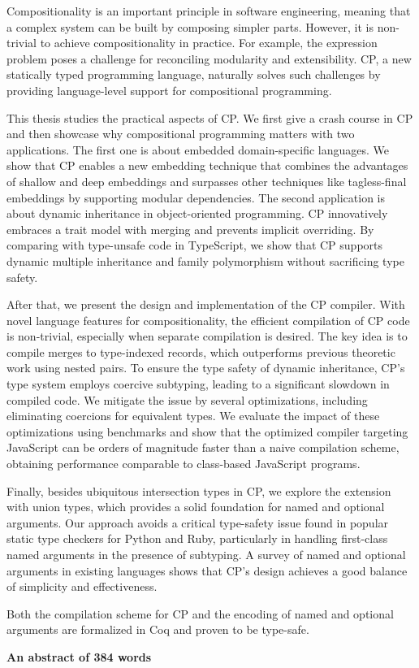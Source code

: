 \noindent
Compositionality is an important principle in software engineering, meaning that
a complex system can be built by composing simpler parts. However, it is
non-trivial to achieve compositionality in practice. For example, the expression
problem poses a challenge for reconciling modularity and extensibility. CP, a
new statically typed programming language, naturally solves such challenges by
providing language-level support for compositional programming.

This thesis studies the practical aspects of CP.
We first give a crash course in CP and then showcase why
compositional programming matters with two applications. The first one is about
embedded domain-specific languages. We show that CP enables a new embedding
technique that combines the advantages of shallow and deep embeddings and
surpasses other techniques like tagless-final embeddings by supporting modular
dependencies. The second application is about dynamic inheritance in
object-oriented programming. CP innovatively embraces a trait model with merging
and prevents implicit overriding. By comparing with type-unsafe code in
TypeScript, we show that CP supports dynamic multiple inheritance and family
polymorphism without sacrificing type safety.

After that, we present the design and implementation of the CP compiler. With novel
language features for compositionality, the efficient compilation of CP code is
non-trivial, especially when separate compilation is desired. The key idea is to
compile merges to type-indexed records, which outperforms previous theoretic work using
nested pairs. To ensure the type safety of dynamic inheritance, CP's type system
employs coercive subtyping, leading to a significant slowdown in compiled code. We
mitigate the issue by several optimizations, including eliminating coercions for
equivalent types. We evaluate the impact of these optimizations using benchmarks
and show that the optimized compiler targeting JavaScript can be orders of
magnitude faster than a naive compilation scheme, obtaining
performance comparable to class-based JavaScript programs.

Finally, besides ubiquitous intersection types in CP, we explore the extension
with union types, which provides a solid foundation for named and optional
arguments. Our approach avoids a critical type-safety issue found in popular static
type checkers for Python and Ruby, particularly in handling first-class named
arguments in the presence of subtyping. A survey of named and optional arguments
in existing languages shows that CP's design achieves a good balance of simplicity
and effectiveness.

Both the compilation scheme for CP and the encoding of named and optional
arguments are formalized in Coq and proven to be type-safe.

\vspace{1.5\baselineskip}

\noindent\makebox[\linewidth]{\rule{0.7\textwidth}{0.4pt}}

\begin{center}
\textbf{An abstract of 384 words}
\end{center}
